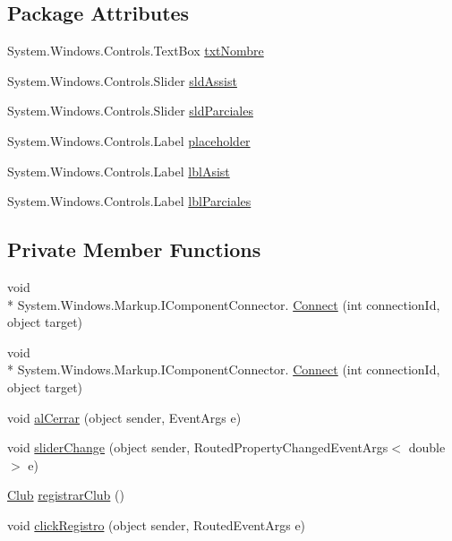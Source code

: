 \subsection*{Package Attributes}
\begin{DoxyCompactItemize}
\item 
System.\-Windows.\-Controls.\-Text\-Box \hyperlink{class_asistencias__wpf_1_1_registro_club_a9acb8f17b99701c92a5afec34b18ea0b}{txt\-Nombre}
\item 
System.\-Windows.\-Controls.\-Slider \hyperlink{class_asistencias__wpf_1_1_registro_club_a3488b5171d3eb821ec59219ca8d4fbf6}{sld\-Assist}
\item 
System.\-Windows.\-Controls.\-Slider \hyperlink{class_asistencias__wpf_1_1_registro_club_aff736140d07e1db41578a56e774b437c}{sld\-Parciales}
\item 
System.\-Windows.\-Controls.\-Label \hyperlink{class_asistencias__wpf_1_1_registro_club_a07b0246ff810b1657973443172007999}{placeholder}
\item 
System.\-Windows.\-Controls.\-Label \hyperlink{class_asistencias__wpf_1_1_registro_club_a974cf03e0b78ba0f297e64b0143ff51c}{lbl\-Asist}
\item 
System.\-Windows.\-Controls.\-Label \hyperlink{class_asistencias__wpf_1_1_registro_club_af0b4a33c9ec145c096e5827435a5e58c}{lbl\-Parciales}
\end{DoxyCompactItemize}
\subsection*{Private Member Functions}
\begin{DoxyCompactItemize}
\item 
void \\*
System.\-Windows.\-Markup.\-I\-Component\-Connector. \hyperlink{class_asistencias__wpf_1_1_registro_club_a26b16e7527259d768b9f9f5766fd7947}{Connect} (int connection\-Id, object target)
\item 
void \\*
System.\-Windows.\-Markup.\-I\-Component\-Connector. \hyperlink{class_asistencias__wpf_1_1_registro_club_a26b16e7527259d768b9f9f5766fd7947}{Connect} (int connection\-Id, object target)
\item 
void \hyperlink{class_asistencias__wpf_1_1_registro_club_a816608f95455c6bbb51d47d9e90eb71d}{al\-Cerrar} (object sender, Event\-Args e)
\item 
void \hyperlink{class_asistencias__wpf_1_1_registro_club_aa5c649a2b0870008205c3172101f2657}{slider\-Change} (object sender, Routed\-Property\-Changed\-Event\-Args$<$ double $>$ e)
\item 
\hyperlink{class_asistencias__wpf_1_1_club}{Club} \hyperlink{class_asistencias__wpf_1_1_registro_club_a7d8e2c0dee7f4f439b0953bf4dbb4358}{registrar\-Club} ()
\item 
void \hyperlink{class_asistencias__wpf_1_1_registro_club_a672b4e93570e543d13d7c3020a216606}{click\-Registro} (object sender, Routed\-Event\-Args e)
\end{DoxyCompactItemize}
